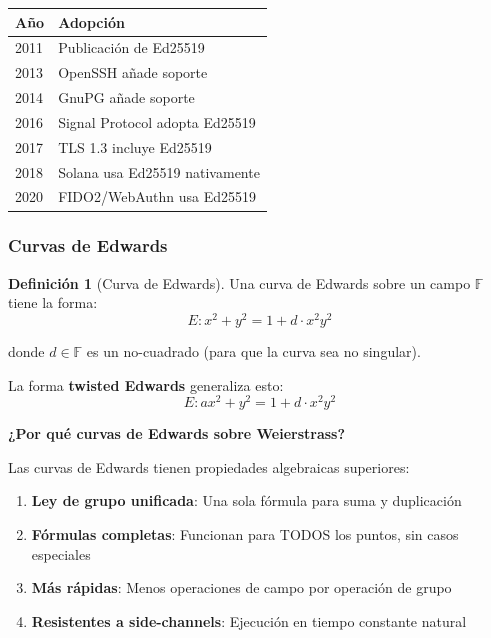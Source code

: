 \documentclass[11pt,a4paper,twoside,openright]{book}
\theoremstyle{definition}
\newtheorem{definition}{Definición}[chapter]
\theoremstyle{plain}
\theoremstyle{remark}
\begin{document}
\begin{center}
\begin{tabular}{ll}
\toprule
\textbf{Año} & \textbf{Adopción} \\
\midrule
2011 & Publicación de Ed25519 \\
2013 & OpenSSH añade soporte \\
2014 & GnuPG añade soporte \\
2016 & Signal Protocol adopta Ed25519 \\
2017 & TLS 1.3 incluye Ed25519 \\
2018 & Solana usa Ed25519 nativamente \\
2020 & FIDO2/WebAuthn usa Ed25519 \\
\bottomrule
\end{tabular}
\end{center}

\subsubsection{Curvas de Edwards}

\begin{definition}[Curva de Edwards]
Una curva de Edwards sobre un campo $\mathbb{F}$ tiene la forma:
\[ E: x^2 + y^2 = 1 + d \cdot x^2 y^2 \]

donde $d \in \mathbb{F}$ es un no-cuadrado (para que la curva sea no singular).

La forma \textbf{twisted Edwards} generaliza esto:
\[ E: ax^2 + y^2 = 1 + d \cdot x^2 y^2 \]
\end{definition}

\begin{keyidea}
\textbf{¿Por qué curvas de Edwards sobre Weierstrass?}

Las curvas de Edwards tienen propiedades algebraicas superiores:
\begin{enumerate}
    \item \textbf{Ley de grupo unificada}: Una sola fórmula para suma y duplicación
    \item \textbf{Fórmulas completas}: Funcionan para TODOS los puntos, sin casos especiales
    \item \textbf{Más rápidas}: Menos operaciones de campo por operación de grupo
    \item \textbf{Resistentes a side-channels}: Ejecución en tiempo constante natural
\end{enumerate}
\end{keyidea}
\end{document}

